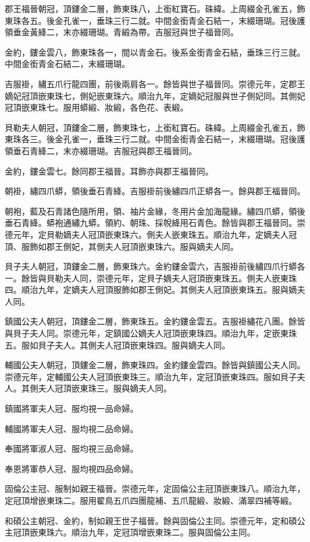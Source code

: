 \begin{pinyinscope}
郡王福晉朝冠，頂鏤金二層，飾東珠八，上銜紅寶石。硃緯。上周綴金孔雀五，飾東珠各五。後金孔雀一，垂珠三行二就。中間金銜青金石結一，末綴珊瑚。冠後護領垂金黃絳二，末亦綴珊瑚。青緞為帶。吉服冠與世子福晉同。

金約，鏤金雲八，飾東珠各一，間以青金石。後系金銜青金石結，垂珠三行三就。中間金銜青金石結二，末綴珊瑚。

吉服褂，繡五爪行龍四團，前後兩肩各一。餘皆與世子福晉同。崇德元年，定郡王嫡妃冠頂嵌東珠七，側妃嵌東珠六。順治九年，定嫡妃冠服與世子側妃同。其側妃冠頂嵌東珠七。服用蟒緞、妝緞，各色花、表緞。

貝勒夫人朝冠，頂鏤金二層，飾東珠七，上銜紅寶石。硃緯。上周綴金孔雀五，飾東珠各三。後金孔雀一，垂珠三行二就。中間金銜青金石結一，末綴珊瑚。冠後護領垂石青絳二，末亦綴珊瑚。吉服冠與郡王福晉同。

金約，鏤金雲七。餘同郡王福晉。耳飾亦與郡王福晉同。

朝褂，繡四爪蟒，領後垂石青絳。吉服褂前後繡四爪正蟒各一。餘與郡王福晉同。

朝袍，藍及石青諸色隨所用，領、袖片金緣，冬用片金加海龍緣。繡四爪蟒，領後垂石青絳。蟒袍通繡九蟒。領約、朝珠、採帨絳用石青色。餘皆與郡王福晉同。崇德元年，定貝勒嫡夫人冠頂嵌東珠六。側夫人嵌東珠五。順治九年，定嫡夫人冠頂、服飾如郡王側妃，其側夫人冠頂嵌東珠六。服與嫡夫人同。

貝子夫人朝冠，頂鏤金二層，飾東珠六。金約鏤金雲六，吉服褂前後繡四爪行蟒各一。餘皆與貝勒夫人同，崇德元年，定貝子嫡夫人冠頂嵌東珠五。側夫人嵌東珠四。順治九年，定嫡夫人冠頂服飾如郡王側妃。其側夫人冠頂嵌東珠五。服與嫡夫人同。

鎮國公夫人朝冠，頂鏤金二層，飾東珠五。金約鏤金雲五。吉服褂繡花八團。餘皆與貝子夫人同。崇德元年，定鎮國公嫡夫人冠頂嵌東珠四。順治九年，定嵌東珠五。服如貝子夫人。其側夫人冠頂嵌東珠四。服與嫡夫人同。

輔國公夫人朝冠，頂鏤金二層，飾東珠四。金約鏤金雲四。餘皆與鎮國公夫人同。崇德元年，定輔國公夫人冠頂嵌東珠三。順治九年，定冠頂嵌東珠四。服如貝子夫人。其側夫人冠頂嵌東珠三。服與嫡夫人同。

鎮國將軍夫人冠、服均視一品命婦。

輔國將軍夫人冠、服均視二品命婦。

奉國將軍淑人冠、服均視三品命婦。

奉恩將軍恭人冠、服均視四品命婦。

固倫公主冠、服制如親王福晉。崇德元年，定固倫公主冠頂嵌東珠八。順治九年，定冠頂增嵌東珠二。服用翟鳥五爪四團龍補、五爪龍緞、妝緞、滿翠四補等緞。

和碩公主朝冠、金約，制如親王世子福晉。餘與固倫公主同。崇德元年，定和碩公主冠頂嵌東珠六。順治九年，定冠頂增嵌東珠二。服與固倫公主同。


\end{pinyinscope}
